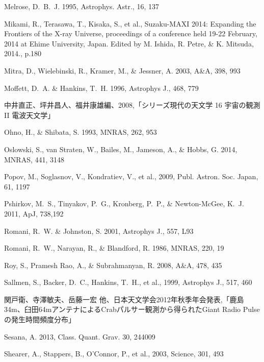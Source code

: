\begin{thebibliography}{99}
\begin{multicols}{2}
{
Melrose, D.~B.~J. 1995, Astrophys. Astr., 16, 137

Mikami, R., Terasawa, T., Kisaka, S., et al., Suzaku-MAXI 2014: Expanding the Frontiers of the X-ray Universe, proceedings of a conference held 19-22 February, 2014 at Ehime University, Japan. Edited by M. Ishida, R. Petre, \& K. Mitsuda, 2014., p.180

Mitra, D., Wielebinski, R., Kramer, M., \& Jessner, A. 2003, A\&A, 398, 993

Moffett, D.~A. \& Hankins, T.~H. 1996, Astrophys J., 468, 779

中井直正、坪井昌人、福井康雄編、2008,「シリーズ現代の天文学 16 宇宙の観測 II 電波天文学」

Ohno, H., \& Shibata, S. 1993, MNRAS, 262, 953

Oslowski, S., van Straten, W., Bailes, M., Jameson, A., \& Hobbs, G. 2014, MNRAS, 441, 3148

Popov, M., Soglasnov, V., Kondratiev, V., et al., 2009, Publ. Astron. Soc. Japan, 61, 1197

Pshirkov, M.~S., Tinyakov, P.~G., Kronberg, P.~P., \& Newton-McGee, K.~J. 2011, ApJ, 738,192

Romani, R.~W. \& Johnston, S. 2001, Astrophys J., 557, L93

Romani, R.~W., Narayan, R., \& Blandford, R. 1986, MNRAS, 220, 19

Roy, S., Pramesh Rao, A., \& Subrahmanyan, R. 2008, A\&A, 478, 435

Sallmen, S., Backer, D.~C., Hankins, T.~H., et al., 1999, Astrophys J., 517, 460

関戸衛、寺澤敏夫、岳藤一宏 他、日本天文学会2012年秋季年会発表,「鹿島34m、臼田64mアンテナによるCrabパルサー観測から得られたGiant Radio Pulseの発生時間頻度分布」

Sesana, A. 2013, Class. Quant. Grav. 30, 244009

Shearer, A., Stappers, B., O'Connor, P., et al., 2003, Science, 301, 493

}
\end{multicols}
\end{thebibliography}
